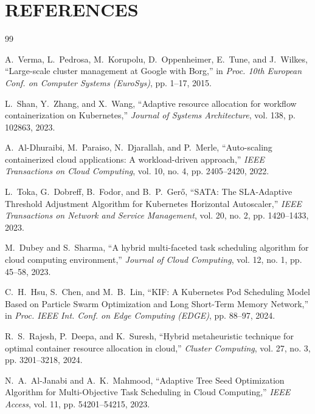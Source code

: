 \documentclass[12pt,a4paper]{report}
\begin{document}
	\chapter{REFERENCES}
	{\renewcommand{\chapter}[2]{}%
		\begin{thebibliography}{99}
			
			A.~Verma, L.~Pedrosa, M.~Korupolu, D.~Oppenheimer, E.~Tune, and J.~Wilkes,
			``Large-scale cluster management at Google with Borg,''
			in \textit{Proc. 10th European Conf. on Computer Systems (EuroSys)}, pp. 1--17, 2015.
			
			L.~Shan, Y.~Zhang, and X.~Wang,
			``Adaptive resource allocation for workflow containerization on Kubernetes,''
			\textit{Journal of Systems Architecture}, vol. 138, p. 102863, 2023.
			
			A.~Al-Dhuraibi, M.~Paraiso, N.~Djarallah, and P.~Merle,
			``Auto-scaling containerized cloud applications: A workload-driven approach,''
			\textit{IEEE Transactions on Cloud Computing}, vol. 10, no. 4, pp. 2405--2420, 2022.
			
			L.~Toka, G.~Dobreff, B.~Fodor, and B.~P.~Ger\H{o},
			``SATA: The SLA-Adaptive Threshold Adjustment Algorithm for Kubernetes Horizontal Autoscaler,''
			\textit{IEEE Transactions on Network and Service Management}, vol. 20, no. 2, pp. 1420--1433, 2023.
			
			M.~Dubey and S.~Sharma,
			``A hybrid multi-faceted task scheduling algorithm for cloud computing environment,''
			\textit{Journal of Cloud Computing}, vol. 12, no. 1, pp. 45--58, 2023.
			
			C.~H.~Hsu, S.~Chen, and M.~B.~Lin,
			``KIF: A Kubernetes Pod Scheduling Model Based on Particle Swarm Optimization and Long Short-Term Memory Network,''
			in \textit{Proc. IEEE Int. Conf. on Edge Computing (EDGE)}, pp. 88--97, 2024.
			
			R.~S.~Rajesh, P.~Deepa, and K.~Suresh,
			``Hybrid metaheuristic technique for optimal container resource allocation in cloud,''
			\textit{Cluster Computing}, vol. 27, no. 3, pp. 3201--3218, 2024.
			
			N.~A.~Al-Janabi and A.~K.~Mahmood,
			``Adaptive Tree Seed Optimization Algorithm for Multi-Objective Task Scheduling in Cloud Computing,''
			\textit{IEEE Access}, vol. 11, pp. 54201--54215, 2023.
			

\end{thebibliography}}
\end{document}
